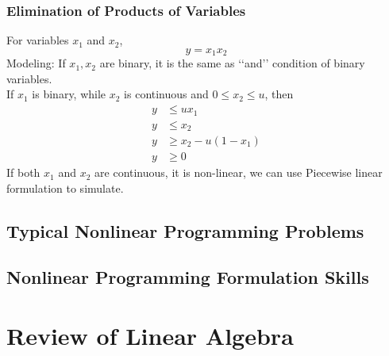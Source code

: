 			\subsection{Elimination of Products of Variables}
				For variables $x_1$ and $x_2$,
				\begin{equation}y = x_1 x_2\end{equation}
				Modeling: If $x_1, x_2$ are binary, it is the same as \lq\lq{}and\rq\rq{} condition of binary variables.\\
				If $x_1$ is binary, while $x_2$ is continuous and $0 \le x_2 \le u$, then
				\begin{align}
					y &\le ux_1  \\
					y &\le x_2  \\
					y &\ge x_2 - u(1- x_1)  \\
					y &\ge 0 
				\end{align}
				If both $x_1$ and $x_2$ are continuous, it is non-linear, we can use Piecewise linear formulation to simulate.

		\section{Typical Nonlinear Programming Problems}

		\section{Nonlinear Programming Formulation Skills}

	\chapter{Review of Linear Algebra}

